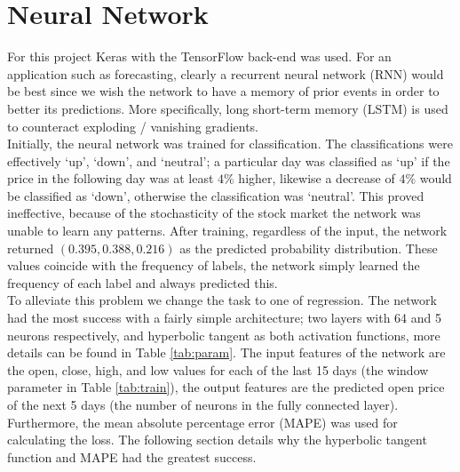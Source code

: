 \documentclass[12pt]{article}
\begin{document}
\section{Neural Network}

For this project Keras with the TensorFlow back-end was used. For an application such as forecasting, clearly a recurrent neural network (RNN) would be best since we wish the network to have a memory of prior events in order to better its predictions. More specifically, long short-term memory (LSTM) is used to counteract exploding / vanishing gradients. \\

Initially, the neural network was trained for classification. The classifications were effectively `up', `down', and `neutral'; a particular day was classified as `up' if the price in the following day was at least $4\%$ higher, likewise a decrease of $4\%$ would be classified as `down', otherwise the classification was `neutral'. This proved ineffective, because of the stochasticity of the stock market the network was unable to learn any patterns. After training, regardless of the input, the network returned $(0.395, 0.388, 0.216)$ as the predicted probability distribution. These values coincide with the frequency of labels, the network simply learned the frequency of each label and always predicted this. \\

To alleviate this problem we change the task to one of regression. The network had the most success with a fairly simple architecture; two layers with 64 and 5 neurons respectively, and hyperbolic tangent as both activation functions, more details can be found in Table \ref{tab:param}. The input features of the network are the open, close, high, and low values for each of the last 15 days (the window parameter in Table \ref{tab:train}), the output features are the predicted open price of the next 5 days (the number of neurons in the fully connected layer). Furthermore, the mean absolute percentage error (MAPE) was used for calculating the loss. The following section details why the hyperbolic tangent function and MAPE had the greatest success.
\end{document}
